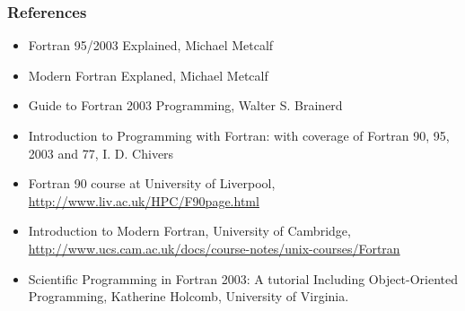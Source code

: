 \documentclass[c,mathserif,compress,xcolor=svgnames]{beamer}
\begin{document}
\begin{frame}
  \frametitle{\small References}
  \begin{itemize}
    \item Fortran 95/2003 Explained, Michael Metcalf
    \item Modern Fortran Explaned, Michael Metcalf
    \item Guide to Fortran 2003 Programming, Walter S. Brainerd
    \item Introduction to Programming with Fortran: with coverage of Fortran 90, 95, 2003 and 77, I. D. Chivers
    \item Fortran 90 course at University of Liverpool, \url{http://www.liv.ac.uk/HPC/F90page.html}
    \item Introduction to Modern Fortran, University of Cambridge, \url{http://www.ucs.cam.ac.uk/docs/course-notes/unix-courses/Fortran}
    \item Scientific Programming in Fortran 2003: A tutorial Including Object-Oriented Programming, Katherine Holcomb, University of Virginia.
  \end{itemize}
\end{frame}
\end{document}
